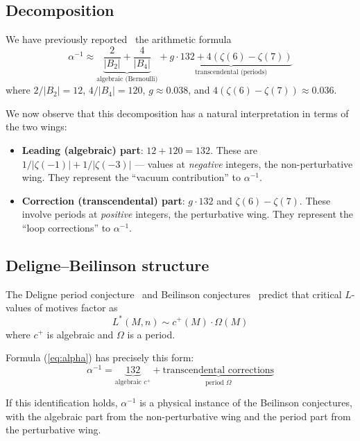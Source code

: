 \documentclass[11pt,a4paper]{article}
\begin{document}
\subsection{Decomposition}

We have previously reported~\cite{wb-alpha} the arithmetic formula
\begin{equation}\label{eq:alpha}
\alpha^{-1} \approx \underbrace{\frac{2}{|B_2|} + \frac{4}{|B_4|}}_{\text{algebraic (Bernoulli)}}
+ \underbrace{g \cdot 132 + 4(\zeta(6) - \zeta(7))}_{\text{transcendental (periods)}}
\end{equation}
where $2/|B_2| = 12$, $4/|B_4| = 120$, $g \approx 0.038$,
and $4(\zeta(6) - \zeta(7)) \approx 0.036$.

We now observe that this decomposition has a natural interpretation
in terms of the two wings:

\begin{itemize}
\item \textbf{Leading (algebraic) part}: $12 + 120 = 132$.
These are $1/|\zeta(-1)| + 1/|\zeta(-3)|$ --- values at
\emph{negative} integers, the non-perturbative wing. They
represent the ``vacuum contribution'' to $\alpha^{-1}$.

\item \textbf{Correction (transcendental) part}: $g \cdot 132$
and $\zeta(6) - \zeta(7)$. These involve periods at
\emph{positive} integers, the perturbative wing. They represent
the ``loop corrections'' to $\alpha^{-1}$.
\end{itemize}

\subsection{Deligne--Beilinson structure}

The Deligne period conjecture~\cite{Deligne1979} and Beilinson
conjectures~\cite{Beilinson1984} predict that critical $L$-values
of motives factor as
\begin{equation}
L^*(M, n) \sim c^+(M) \cdot \Omega(M)
\end{equation}
where $c^+$ is algebraic and $\Omega$ is a period.

Formula (\ref{eq:alpha}) has precisely this form:
\begin{equation}
\alpha^{-1} = \underbrace{132}_{\text{algebraic } c^+}
+ \underbrace{\text{transcendental corrections}}_{\text{period } \Omega}
\end{equation}

If this identification holds, $\alpha^{-1}$ is a physical instance
of the Beilinson conjectures, with the algebraic part from the
non-perturbative wing and the period part from the perturbative wing.
\end{document}
